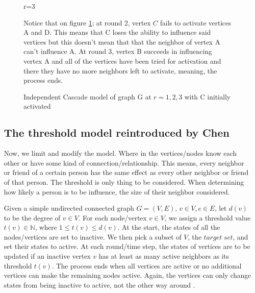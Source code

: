 \begin{figure}[!bp]
\begin{minipage}{0.3\textwidth}
\caption{r=3}
	\end{minipage}
\caption{Independent Cascade model of graph G at $r=1,2,3$ with C initially activated\\}
\label{Independentfig1}
\vspace{0.5cm}
Notice that on figure \ref{Independentfig1}; at round 2, vertex $C$ fails to activate vertices A and D. This means that C loses the ability to influence said vertices but this doesn't mean that that the neighbor of vertex A can't influence A. At round 3, vertex B succeeds in influencing vertex A and all of the vertices have been tried for activation and there they have no more neighbors left to activate, meaning, the process ends.
\end{figure}


\newpage
\subsection{The threshold model reintroduced by Chen}

Now, we limit and modify the model. Where in the vertices/nodes know each other or have some kind of connection/relationship. This means, every neighbor or friend of a certain person has the same effect as every other neighbor or friend of that person. The threshold is only thing to be considered. When determining how likely a person is to be influence, the size of their neighbor considered.

Given a simple undirected connected graph $G=(V,E)$, $v \in V, e \in E$, let $d(v)$ to be the degree of $v \in V$. For each node/vertex $v \in V$, we assign a threshold value $t(v) \in \mathbb{N}$, where $1 \leq t(v) \leq d(v)$. At the start, the states of all the nodes/vertices are set to inactive. We then pick a subset of $V$, the $target\; set$, and set their states to active. At each round/time step, the states of vertices are to be updated if an inactive vertex $v$ has at least as many active neighbors as its threshold $t(v)$. The process ends when all vertices are active or no additional vertices can make the remaining nodes active. Again, the vertices can only change states from being inactive to active, not the other way around \cite{chen}.

